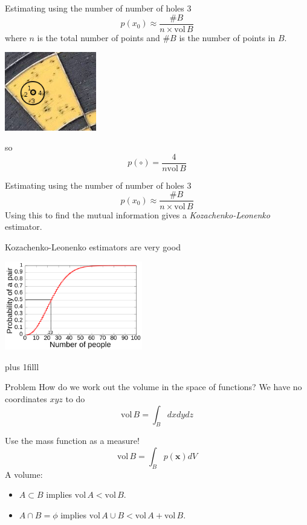 \documentclass{beamer}
\newcommand{\btVFill}{\vskip0pt plus 1filll}
\begin{document}
\begin{frame}{Estimating using the number of number of holes 3}
\color{dark}
$$p(x_0)\approx\frac{\#B}{n\times \mbox{vol}\,B}
$$
\color{black}
where $n$ is the total number of points and $\#B$ is the number of points in $B$.
\color{reddish}
\begin{center}
\includegraphics[width=4cm]{dart_board_zoom_ball.png}
\end{center}
\color{dark}
so 
$$p(\circ)=\frac{4}{n\mbox{vol}\,B}$$
\end{frame}


\begin{frame}{Estimating using the number of number of holes 3}
\color{dark}
$$p(x_0)\approx\frac{\#B}{n\times \mbox{vol}\,B}$$
\color{black}
Using this to find the mutual information gives a \textsl{Kozachenko-Leonenko} estimator.
\end{frame}

\begin{frame}{Kozachenko-Leonenko estimators are very good}
\color{reddish}
\begin{center}
\includegraphics[width=6cm]{Birthday_Paradox.png}
\end{center}
\color{black}
\btVFill
\color{gray}
\color{black}
\end{frame}



\begin{frame}{Problem}
\color{black}
How do we work out the volume in the space of functions? We have no coordinates $xyz$ to do
\color{dark}
$$\mbox{vol}\,B=\int_B dxdydz$$
\end{frame}


\begin{frame}{Use the mass function as a measure!}
\color{dark}
$$\mbox{vol}\,B=\int_B p(\mathbf{x}) dV$$
\color{black}
A volume: 
\begin{itemize}
\item $A\subset B$ implies $\mbox{vol}\,A<\mbox{vol}\,B$.
\item $A\cap B=\phi$ implies $\mbox{vol}\,A\cup B<\mbox{vol}\,A+\mbox{vol}\,B$.
\end{itemize}
\end{frame}
\end{document}
